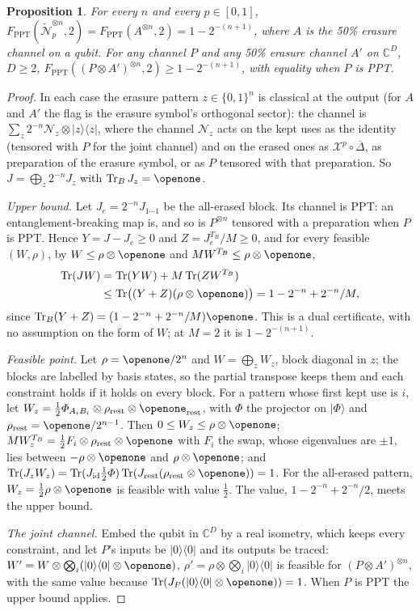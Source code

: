 \documentclass[aps,pra,twocolumn,superscriptaddress,nofootinbib,longbibliography,floatfix]{revtex4-2}
\newtheorem{proposition}[theorem]{Proposition}
\newcommand{\ket}[1]{|#1\rangle}
\newcommand{\proj}[1]{|#1\rangle\langle #1|}
\newcommand{\tr}{\operatorname{Tr}}
\newcommand{\nt}{\widetilde{\mathcal N}}
\newcommand{\deph}{\overline{\varDelta}}
\newcommand{\mes}{\varPhi}
\newcommand{\id}{\mathrm{id}}
\begin{document}
\begin{proposition}
\label{prop:ppt}
For every $n$ and every $p\in[0,1]$, $F_{\mathrm{PPT}}(\nt_p^{\otimes n},2)=F_{\mathrm{PPT}}(A^{\otimes n},2)=1-2^{-(n+1)}$, where $A$ is the 50\% erasure channel on a qubit. For any channel $P$ and any 50\% erasure channel $A'$ on $\mathbb C^D$, $D\ge2$, $F_{\mathrm{PPT}}((P\otimes A')^{\otimes n},2)\ge1-2^{-(n+1)}$, with equality when $P$ is PPT.
\end{proposition}
\begin{proof}
In each case the erasure pattern $z\in\{0,1\}^n$ is classical at the output (for $A$ and $A'$ the flag is the erasure symbol's orthogonal sector): the channel is $\sum_z2^{-n}\mathcal N_z\otimes\proj z$, where the channel $\mathcal N_z$ acts on the kept uses as the identity (tensored with $P$ for the joint channel) and on the erased ones as $\mathcal X^p\circ\deph$, as preparation of the erasure symbol, or as $P$ tensored with that preparation. So $J=\bigoplus_z2^{-n}J_z$ with $\tr_BJ_z=\openone$.

\emph{Upper bound.} Let $J_e=2^{-n}J_{1\cdots1}$ be the all-erased block. Its channel is PPT: an entanglement-breaking map is, and so is $P^{\otimes n}$ tensored with a preparation when $P$ is PPT. Hence $Y=J-J_e\ge0$ and $Z=J_e^{T_B}/M\ge0$, and for every feasible $(W,\rho)$, by $W\le\rho\otimes\openone$ and $MW^{T_B}\le\rho\otimes\openone$,
\begin{align*}
\tr(JW)&=\tr(YW)+M\tr(ZW^{T_B})\\
&\le\tr\bigl((Y+Z)(\rho\otimes\openone)\bigr)=1-2^{-n}+2^{-n}/M,
\end{align*}
since $\tr_B(Y+Z)=(1-2^{-n}+2^{-n}/M)\openone$. This is a dual certificate, with no assumption on the form of $W$; at $M=2$ it is $1-2^{-(n+1)}$.

\emph{Feasible point.} Let $\rho=\openone/2^n$ and $W=\bigoplus_zW_z$, block diagonal in $z$; the blocks are labelled by basis states, so the partial transpose keeps them and each constraint holds if it holds on every block. For a pattern whose first kept use is $i$, let $W_z=\frac12\mes_{A_iB_i}\otimes\rho_{\mathrm{rest}}\otimes\openone_{\mathrm{rest}}$, with $\mes$ the projector on $\ket{\mes}$ and $\rho_{\mathrm{rest}}=\openone/2^{n-1}$. Then $0\le W_z\le\rho\otimes\openone$; $MW_z^{T_B}=\frac12F_i\otimes\rho_{\mathrm{rest}}\otimes\openone$ with $F_i$ the swap, whose eigenvalues are $\pm1$, lies between $-\rho\otimes\openone$ and $\rho\otimes\openone$; and $\tr(J_zW_z)=\tr(J_{\id}\frac12\mes)\tr(J_{\mathrm{rest}}(\rho_{\mathrm{rest}}\otimes\openone))=1$. For the all-erased pattern, $W_z=\frac12\rho\otimes\openone$ is feasible with value $\frac12$. The value, $1-2^{-n}+2^{-n}/2$, meets the upper bound.

\emph{The joint channel.} Embed the qubit in $\mathbb C^D$ by a real isometry, which keeps every constraint, and let $P$'s inputs be $\proj0$ and its outputs be traced: $W'=W\otimes\bigotimes_i(\proj0\otimes\openone)$, $\rho'=\rho\otimes\bigotimes_i\proj0$ is feasible for $(P\otimes A')^{\otimes n}$, with the same value because $\tr(J_P(\proj0\otimes\openone))=1$. When $P$ is PPT the upper bound applies.
\end{proof}
\end{document}
